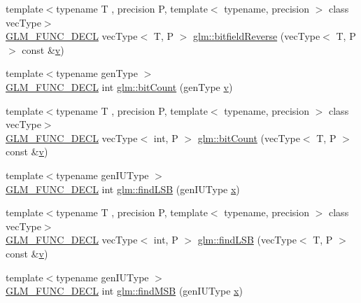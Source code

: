 \begin{DoxyCompactItemize}
\item 
{\footnotesize template$<$typename T , precision P, template$<$ typename, precision $>$ class vec\+Type$>$ }\\\mbox{\hyperlink{setup_8hpp_ab2d052de21a70539923e9bcbf6e83a51}{G\+L\+M\+\_\+\+F\+U\+N\+C\+\_\+\+D\+E\+CL}} vec\+Type$<$ T, P $>$ \mbox{\hyperlink{group__core__func__integer_ga153e7e8d0c035f83cce50fc3e580930f}{glm\+::bitfield\+Reverse}} (vec\+Type$<$ T, P $>$ const \&\mbox{\hyperlink{glad_8h_a14cfbe2fc2234f5504618905b69d1e06}{v}})
\item 
{\footnotesize template$<$typename gen\+Type $>$ }\\\mbox{\hyperlink{setup_8hpp_ab2d052de21a70539923e9bcbf6e83a51}{G\+L\+M\+\_\+\+F\+U\+N\+C\+\_\+\+D\+E\+CL}} int \mbox{\hyperlink{group__core__func__integer_ga44abfe3379e11cbd29425a843420d0d6}{glm\+::bit\+Count}} (gen\+Type \mbox{\hyperlink{glad_8h_a14cfbe2fc2234f5504618905b69d1e06}{v}})
\item 
{\footnotesize template$<$typename T , precision P, template$<$ typename, precision $>$ class vec\+Type$>$ }\\\mbox{\hyperlink{setup_8hpp_ab2d052de21a70539923e9bcbf6e83a51}{G\+L\+M\+\_\+\+F\+U\+N\+C\+\_\+\+D\+E\+CL}} vec\+Type$<$ int, P $>$ \mbox{\hyperlink{group__core__func__integer_ga1f29640969a3c54564da06ac67a5392e}{glm\+::bit\+Count}} (vec\+Type$<$ T, P $>$ const \&\mbox{\hyperlink{glad_8h_a14cfbe2fc2234f5504618905b69d1e06}{v}})
\item 
{\footnotesize template$<$typename gen\+I\+U\+Type $>$ }\\\mbox{\hyperlink{setup_8hpp_ab2d052de21a70539923e9bcbf6e83a51}{G\+L\+M\+\_\+\+F\+U\+N\+C\+\_\+\+D\+E\+CL}} int \mbox{\hyperlink{group__core__func__integer_gaf74c4d969fa34ab8acb9d390f5ca5274}{glm\+::find\+L\+SB}} (gen\+I\+U\+Type \mbox{\hyperlink{glad_8h_a92d0386e5c19fb81ea88c9f99644ab1d}{x}})
\item 
{\footnotesize template$<$typename T , precision P, template$<$ typename, precision $>$ class vec\+Type$>$ }\\\mbox{\hyperlink{setup_8hpp_ab2d052de21a70539923e9bcbf6e83a51}{G\+L\+M\+\_\+\+F\+U\+N\+C\+\_\+\+D\+E\+CL}} vec\+Type$<$ int, P $>$ \mbox{\hyperlink{group__core__func__integer_ga014a72009e68233c34c06a6dc2251b8c}{glm\+::find\+L\+SB}} (vec\+Type$<$ T, P $>$ const \&\mbox{\hyperlink{glad_8h_a14cfbe2fc2234f5504618905b69d1e06}{v}})
\item 
{\footnotesize template$<$typename gen\+I\+U\+Type $>$ }\\\mbox{\hyperlink{setup_8hpp_ab2d052de21a70539923e9bcbf6e83a51}{G\+L\+M\+\_\+\+F\+U\+N\+C\+\_\+\+D\+E\+CL}} int \mbox{\hyperlink{group__core__func__integer_ga7e4a794d766861c70bc961630f8ef621}{glm\+::find\+M\+SB}} (gen\+I\+U\+Type \mbox{\hyperlink{glad_8h_a92d0386e5c19fb81ea88c9f99644ab1d}{x}})

\end{DoxyCompactItemize}
